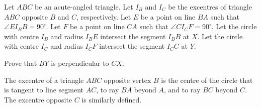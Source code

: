 Let $ABC$ be an acute-angled triangle. Let $I_B$ and $I_C$ be the excentres of triangle $ABC$ opposite $B$ and $C$, respectively. Let $E$ be a point on line $BA$ such that $\angle EI_BB=90^\circ$. Let $F$ be a point on line $CA$ such that $\angle CI_CF=90^\circ$. Let the circle with centre $I_B$ and radius $I_BE$ intersect the segment $I_BB$ at $X$. Let the circle with centre $I_C$ and radius $I_CF$ intersect the segment $I_CC$ at $Y$.

Prove that $BY$ is perpendicular to $CX$.

The excentre of a triangle $ABC$ opposite vertex $B$ is the centre of the circle that is tangent to line segment $AC$, to ray $BA$ beyond $A$, and to ray $BC$ beyond $C$. The excentre opposite $C$ is similarly defined.
